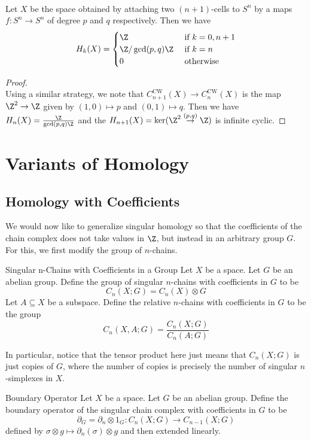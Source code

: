 \documentclass[a4paper]{article}
\begin{document}
\begin{eg}{}{}\\
Let $X$ be the space obtained by attaching two $(n+1)$-cells to $S^n$ by a maps $f:S^n\to S^n$ of degree $p$ and $q$ respectively. Then we have $$H_k(X)=\begin{cases}
\Z & \text{ if }k=0,n+1\\
\Z/\gcd(p,q)\Z & \text{ if }k=n\\
0 & \text{ otherwise }
\end{cases}$$
\begin{proof}\\
Using a similar strategy, we note that $C_{n+1}^\text{CW}(X)\to C_n^\text{CW}(X)$ is the map $\Z^2\to\Z$ given by $(1,0)\mapsto p$ and $(0,1)\mapsto q$. Then we have $H_n(X)=\frac{\Z}{\gcd(p,q)\Z}$ and the $H_{n+1}(X)=\ker(\Z^2\overset{(p,q)}{\to}\Z)$ is infinite cyclic.  
\end{proof}
\end{eg}

\pagebreak
\section{Variants of Homology}
\subsection{Homology with Coefficients}
We would now like to generalize singular homology so that the coefficients of the chain complex does not take values in $\Z$, but instead in an arbitrary group $G$. For this, we first modify the group of $n$-chains. 

\begin{defn}{Singular n-Chains with Coefficients in a Group}{} Let $X$ be a space. Let $G$ be an abelian group. Define the group of singular $n$-chains with coefficients in $G$ to be $$C_n(X;G)=C_n(X)\otimes G$$ Let $A\subseteq X$ be a subspace. Define the relative $n$-chains with coefficients in $G$ to be the group $$C_n(X,A;G)=\frac{C_n(X;G)}{C_n(A;G)}$$
\end{defn}

In particular, notice that the tensor product here just means that $C_n(X;G)$ is just copies of $G$, where the number of copies is precisely the number of singular $n$-simplexes in $X$. 

\begin{defn}{Boundary Operator}{} Let $X$ be a space. Let $G$ be an abelian group. Define the boundary operator of the singular chain complex with coefficients in $G$ to be $$\partial_G=\partial_n\otimes 1_G:C_n(X;G)\to C_{n-1}(X;G)$$ defined by $\sigma\otimes g\mapsto\partial_n(\sigma)\otimes g$ and then extended linearly. 
\end{defn}
\end{document}
